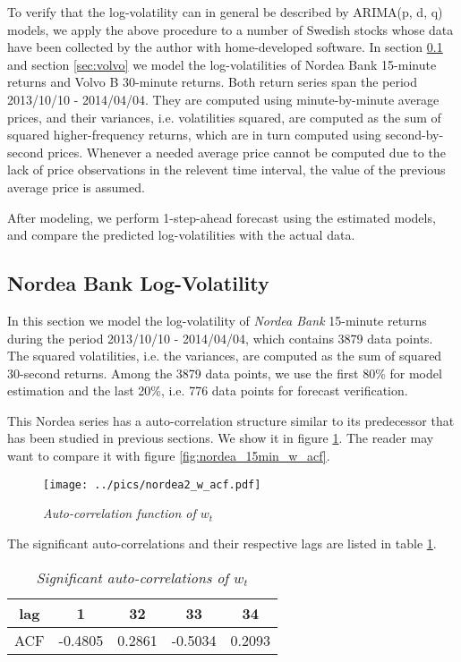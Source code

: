 To verify that the log-volatility can in general be described by
ARIMA(p, d, q) models, we apply the above procedure to a number of
Swedish stocks whose data have been collected by the author with
home-developed software. In section \ref{sec:nordea} and section \ref{sec:volvo}
we model the log-volatilities of Nordea Bank 15-minute returns and
Volvo B 30-minute returns. Both return series span the period
2013/10/10 - 2014/04/04. They are computed using minute-by-minute
average prices, and their variances, i.e. volatilities squared, are
computed as the sum of squared higher-frequency returns, which are in
turn computed using second-by-second prices. Whenever a needed average
price cannot be computed due to the lack of price observations in the
relevent time interval, the value of the previous average price is
assumed.

After modeling, we perform 1-step-ahead forecast using the estimated
models, and compare the predicted log-volatilities with the actual
data.

\subsection{Nordea Bank Log-Volatility}\label{sec:nordea}
In this section we model the log-volatility of {\it Nordea Bank}
15-minute returns during the period 2013/10/10 - 2014/04/04, which
contains 3879 data points. The squared volatilities, i.e. the
variances, are computed as the sum of squared 30-second returns. Among
the 3879 data points, we use the first 80\% for model estimation and
the last 20\%, i.e. 776 data points for forecast verification.

This Nordea series has a auto-correlation structure similar to its
predecessor that has been studied in previous sections. We show it in
figure \ref{fig:nordea2_w_acf}. The reader may want to compare it with
figure \ref{fig:nordea_15min_w_acf}.
\begin{figure}[htb!]
  \centering
  \texttt{[image: ../pics/nordea2\_w\_acf.pdf]}
  \caption{\small \it Auto-correlation function of $w_t$}
  \label{fig:nordea2_w_acf}
\end{figure}
The significant auto-correlations and their respective lags are listed
in table \ref{tab:nordea2_w_acf}.
\begin{table}[htb!]
  \centering
  \begin{tabular}{|c|c|c|c|c|}
    \hline
    lag & 1 & 32 & 33 & 34 \\
    \hline
    ACF &   -0.4805 & 0.2861 &  -0.5034 & 0.2093 \\
    \hline
  \end{tabular}
  \caption{\small \it Significant auto-correlations of $w_t$}
  \label{tab:nordea2_w_acf}
\end{table}

